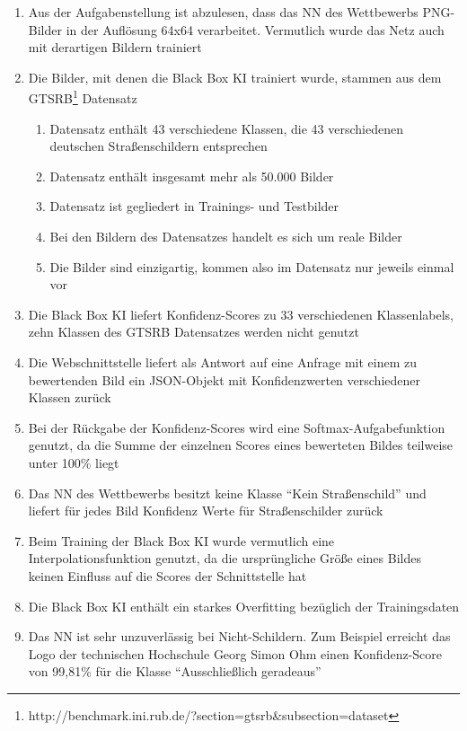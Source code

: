 \begin{enumerate}
	\item Aus der Aufgabenstellung ist abzulesen, dass das \ac{NN} des Wettbewerbs PNG-Bilder in der Auflösung 64x64 verarbeitet. Vermutlich wurde das Netz auch mit derartigen Bildern trainiert
	\item Die Bilder, mit denen die Black Box \ac{KI} trainiert wurde, stammen aus dem GTSRB\footnote{http://benchmark.ini.rub.de/?section=gtsrb\&subsection=dataset} Datensatz
	\begin{enumerate}
		\item Datensatz enthält 43 verschiedene Klassen, die 43 verschiedenen deutschen Straßenschildern entsprechen
		\item Datensatz enthält insgesamt mehr als 50.000 Bilder
		\item Datensatz ist gegliedert in Trainings- und Testbilder
		\item Bei den Bildern des Datensatzes handelt es sich um reale Bilder
		\item Die Bilder sind einzigartig, kommen also im Datensatz nur jeweils einmal vor
	\end{enumerate}
	\item Die Black Box \ac{KI} liefert Konfidenz-Scores zu 33 verschiedenen Klassenlabels, zehn Klassen des \ac{GTSRB} Datensatzes werden nicht genutzt
	\item Die Webschnittstelle liefert als Antwort auf eine Anfrage mit einem zu bewertenden Bild ein JSON-Objekt mit Konfidenzwerten verschiedener Klassen zurück
	\item Bei der Rückgabe der Konfidenz-Scores wird eine Softmax-Aufgabefunktion genutzt, da die Summe der einzelnen Scores eines bewerteten Bildes teilweise unter 100\% liegt
	\item Das \ac{NN} des Wettbewerbs besitzt keine Klasse "`Kein Straßenschild"' und liefert für jedes Bild Konfidenz Werte für Straßenschilder zurück
	\item Beim Training der Black Box \ac{KI} wurde vermutlich eine Interpolationsfunktion genutzt, da die ursprüngliche Größe eines Bildes keinen Einfluss auf die Scores der Schnittstelle hat  
	\item Die Black Box \ac{KI} enthält ein starkes Overfitting bezüglich der Trainingsdaten
	\item Das \ac{NN} ist sehr unzuverlässig bei Nicht-Schildern. Zum Beispiel erreicht das Logo der technischen Hochschule Georg Simon Ohm einen Konfidenz-Score von 99,81\% für die Klasse "`Ausschließlich geradeaus"'
\end{enumerate}


